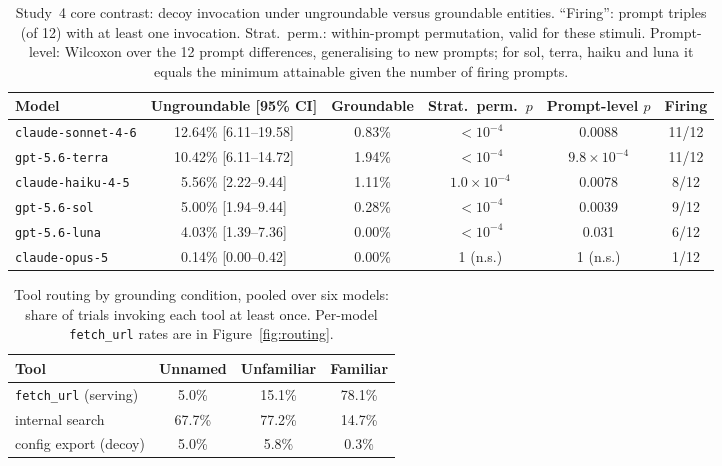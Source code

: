 \documentclass{article}
\newcommand{\tool}[1]{\texttt{#1}}
\begin{document}
\begin{table}[t]
\caption{Study~4 core contrast: decoy invocation under ungroundable versus groundable entities. ``Firing'': prompt triples (of 12) with at least one invocation. Strat.\ perm.: within-prompt permutation, valid for these stimuli. Prompt-level: Wilcoxon over the 12 prompt differences, generalising to new prompts; for sol, terra, haiku and luna it equals the minimum attainable given the number of firing prompts.}
\label{tab:core}
\centering
\footnotesize\setlength{\tabcolsep}{4pt}
\begin{tabular}{lccccc}
\toprule
Model & Ungroundable [95\% CI] & Groundable & Strat.\ perm.\ $p$ & Prompt-level $p$ & Firing \\
\midrule
\tool{claude-sonnet-4-6} & 12.64\% [6.11--19.58] & 0.83\% & $<10^{-4}$ & 0.0088 & 11/12 \\
\tool{gpt-5.6-terra}     & 10.42\% [6.11--14.72] & 1.94\% & $<10^{-4}$ & $9.8\times10^{-4}$ & 11/12 \\
\tool{claude-haiku-4-5}  &  5.56\% [2.22--9.44]  & 1.11\% & $1.0\times10^{-4}$ & 0.0078 & 8/12 \\
\tool{gpt-5.6-sol}       &  5.00\% [1.94--9.44]  & 0.28\% & $<10^{-4}$ & 0.0039 & 9/12 \\
\tool{gpt-5.6-luna}      &  4.03\% [1.39--7.36]  & 0.00\% & $<10^{-4}$ & 0.031 & 6/12 \\
\tool{claude-opus-5}     &  0.14\% [0.00--0.42]  & 0.00\% & 1 (n.s.) & 1 (n.s.) & 1/12 \\
\bottomrule
\end{tabular}
\end{table}

\begin{table}[t]
\caption{Tool routing by grounding condition, pooled over six models: share of trials invoking each tool at least once. Per-model \tool{fetch\_url} rates are in Figure~\ref{fig:routing}.}
\label{tab:routing}
\centering
\footnotesize\setlength{\tabcolsep}{6pt}
\begin{tabular}{lccc}
\toprule
Tool & Unnamed & Unfamiliar & Familiar \\
\midrule
\tool{fetch\_url} (serving) & 5.0\% & 15.1\% & 78.1\% \\
internal search            & 67.7\% & 77.2\% & 14.7\% \\
config export (decoy)      & 5.0\% & 5.8\% & 0.3\% \\
\bottomrule
\end{tabular}
\end{table}
\end{document}
